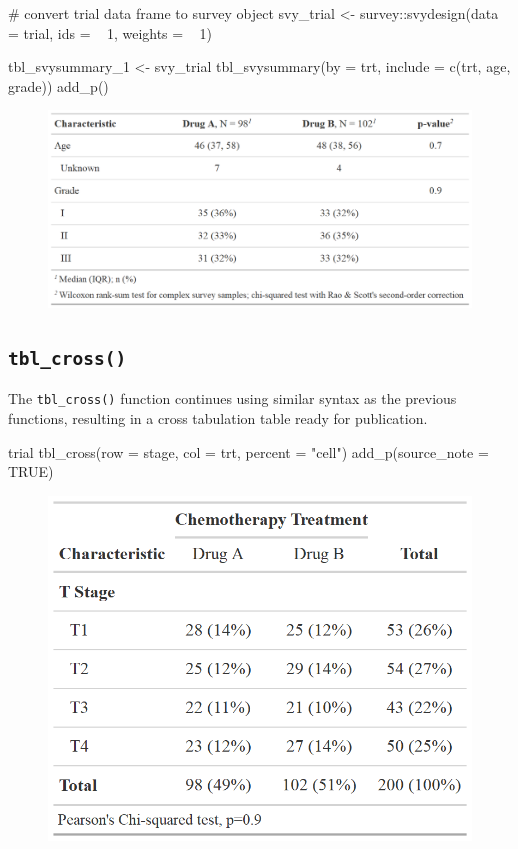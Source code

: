 \begin{example}
# convert trial data frame to survey object
svy_trial <- survey::svydesign(data = trial, ids = ~ 1, weights = ~ 1)

tbl_svysummary_1 <-
  svy_trial %
  tbl_svysummary(by = trt, include = c(trt, age, grade)) %
  add_p()
\end{example}
\begin{figure}[h!]
  \includegraphics[scale=0.28]{svysummary.png}
  \centering
\end{figure}

\subsection{\texorpdfstring{\texttt{tbl\_cross()}}{tbl\_cross()}}

The \texttt{tbl\_cross()} function continues using similar syntax as the previous functions, resulting in a cross tabulation table ready for publication. 

\begin{example}
trial %
  tbl_cross(row = stage, col = trt, percent = "cell") %
  add_p(source_note = TRUE)
\end{example}
\begin{figure}[h!]
  \includegraphics[scale=0.28]{cross.png}
  \centering
\end{figure}

